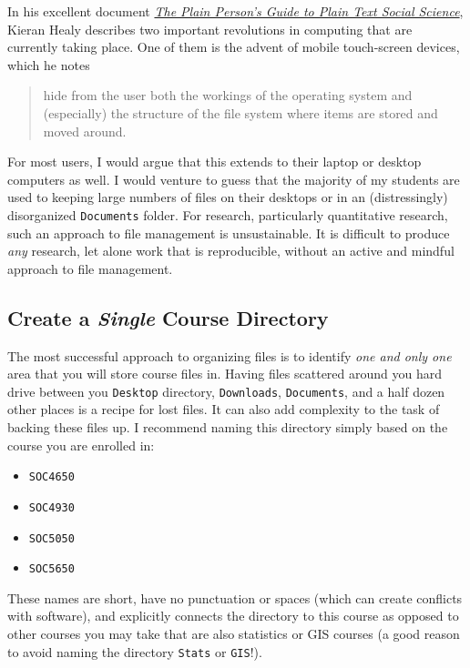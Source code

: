 \documentclass[]{book}
\providecommand{\tightlist}{%
  \setlength{\itemsep}{0pt}\setlength{\parskip}{0pt}}
\theoremstyle{definition}
\theoremstyle{definition}
\theoremstyle{definition}
\theoremstyle{remark}
\begin{document}
In his excellent document \href{http://plain-text.co}{\emph{The Plain
Person's Guide to Plain Text Social Science}}, Kieran Healy describes
two important revolutions in computing that are currently taking place.
One of them is the advent of mobile touch-screen devices, which he notes

\begin{quote}
hide from the user both the workings of the operating system and
(especially) the structure of the file system where items are stored and
moved around.
\end{quote}

For most users, I would argue that this extends to their laptop or
desktop computers as well. I would venture to guess that the majority of
my students are used to keeping large numbers of files on their desktops
or in an (distressingly) disorganized \texttt{Documents} folder. For
research, particularly quantitative research, such an approach to file
management is unsustainable. It is difficult to produce \emph{any}
research, let alone work that is reproducible, without an active and
mindful approach to file management.

\subsection{\texorpdfstring{Create a \emph{Single} Course
Directory}{Create a Single Course Directory}}\label{create-a-single-course-directory}

The most successful approach to organizing files is to identify
\emph{one and only one} area that you will store course files in. Having
files scattered around you hard drive between you \texttt{Desktop}
directory, \texttt{Downloads}, \texttt{Documents}, and a half dozen
other places is a recipe for lost files. It can also add complexity to
the task of backing these files up. I recommend naming this directory
simply based on the course you are enrolled in:

\begin{itemize}
\tightlist
\item
  \texttt{SOC4650}
\item
  \texttt{SOC4930}
\item
  \texttt{SOC5050}
\item
  \texttt{SOC5650}
\end{itemize}

These names are short, have no punctuation or spaces (which can create
conflicts with software), and explicitly connects the directory to this
course as opposed to other courses you may take that are also statistics
or GIS courses (a good reason to avoid naming the directory
\texttt{Stats} or \texttt{GIS}!).
\end{document}
